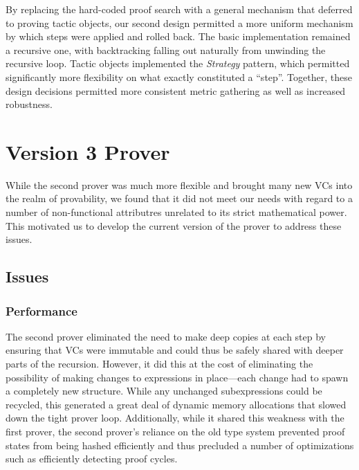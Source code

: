 By replacing the hard-coded proof search with a general mechanism that deferred to proving tactic objects, our second design permitted a more uniform mechanism by which steps were applied and rolled back.  The basic implementation remained a recursive one, with backtracking falling out naturally from unwinding the recursive loop.  Tactic objects implemented the \emph{Strategy} pattern, which permitted significantly more flexibility on what exactly constituted a ``step''.  Together, these design decisions permitted more consistent metric gathering as well as increased robustness.


\section{Version 3 Prover}

While the second prover was much more flexible and brought many new VCs into the realm of provability, we found that it did not meet our needs with regard to a number of non-functional attributres unrelated to its strict mathematical power.  This motivated us to develop the current version of the prover to address these issues.

	\subsection{Issues}	%

		\subsubsection{Performance}	%

The second prover eliminated the need to make deep copies at each step by ensuring that VCs were immutable and could thus be safely shared with deeper parts of the recursion.  However, it did this at the cost of eliminating the possibility of making changes to expressions in place---each change had to spawn a completely new structure.  While any unchanged subexpressions could be recycled, this generated a great deal of dynamic memory allocations that slowed down the tight prover loop.  Additionally, while it shared this weakness with the first prover, the second prover's reliance on the old type system prevented proof states from being hashed efficiently and thus precluded a number of optimizations such as efficiently detecting proof cycles.

